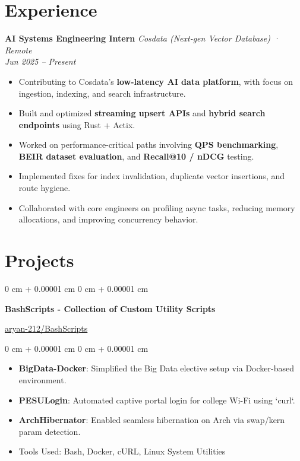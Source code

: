 \documentclass[10pt, letterpaper]{article}
\newenvironment{highlights}{
    \begin{itemize}[
        topsep=0.10 cm,
        parsep=0.10 cm,
        partopsep=0pt,
        itemsep=0pt,
        leftmargin=0 cm + 10pt
    ]
}{
    \end{itemize}
} %
\newenvironment{onecolentry}{
    \begin{adjustwidth}{
        0 cm + 0.00001 cm
    }{
        0 cm + 0.00001 cm
    }
}{
    \end{adjustwidth}
} %
\newenvironment{twocolentry}[2][]{
    \onecolentry
    \def\secondColumn{#2}
    \setcolumnwidth{\fill, 4.5 cm}
    \begin{paracol}{2}
}{
    \switchcolumn \raggedleft \secondColumn
    \end{paracol}
    \endonecolentry
} %
\begin{document}
\section{Experience}

\textbf{AI Systems Engineering Intern} \hfill \textit{Cosdata (Next-gen Vector Database) · Remote} \\
\textit{Jun 2025 – Present}
\vspace{-0.5em}
\begin{itemize}
  \setlength\itemsep{0.3em}
  \item Contributing to Cosdata’s \textbf{low-latency AI data platform}, with focus on ingestion, indexing, and search infrastructure.
  \item Built and optimized \textbf{streaming upsert APIs} and \textbf{hybrid search endpoints} using Rust + Actix.
  \item Worked on performance-critical paths involving \textbf{QPS benchmarking}, \textbf{BEIR dataset evaluation}, and \textbf{Recall@10 / nDCG} testing.
  \item Implemented fixes for index invalidation, duplicate vector insertions, and route hygiene.
  \item Collaborated with core engineers on profiling async tasks, reducing memory allocations, and improving concurrency behavior.
\end{itemize}

\section{Projects}

\begin{twocolentry}{
    \href{https://github.com/aryan-212/BashScripts}{aryan-212/BashScripts}
}
    \textbf{BashScripts - Collection of Custom Utility Scripts}
\end{twocolentry}

\begin{onecolentry}
    \begin{highlights}
        \item \textbf{BigData-Docker}: Simplified the Big Data elective setup via Docker-based environment.
        \item \textbf{PESULogin}: Automated captive portal login for college Wi-Fi using `curl`.
        \item \textbf{ArchHibernator}: Enabled seamless hibernation on Arch via swap/kern param detection.
        \item Tools Used: Bash, Docker, cURL, Linux System Utilities
    \end{highlights}
\end{onecolentry}
\end{document}
